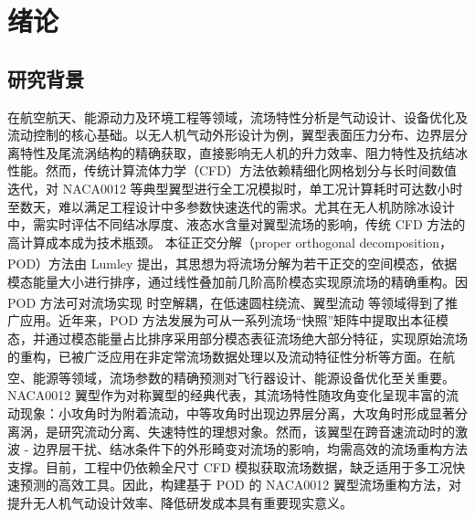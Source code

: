 \usetikzlibrary{shapes,arrows,positioning}

\chapter{绪论}
\label{cha:introduction}
\section{研究背景}
\label{sec:background}
在航空航天、能源动力及环境工程等领域，流场特性分析是气动设计、设备优化及流动控制的核心基础。以无人机气动外形设计为例，翼型表面压力分布、边界层分离特性及尾流涡结构的精确获取，直接影响无人机的升力效率、阻力特性及抗结冰性能。然而，传统计算流体力学（CFD）方法依赖精细化网格划分与长时间数值迭代，对 NACA0012 等典型翼型进行全工况模拟时，单工况计算耗时可达数小时至数天，难以满足工程设计中多参数快速迭代的需求。尤其在无人机防除冰设计中，需实时评估不同结冰厚度、液态水含量对翼型流场的影响，传统 CFD 方法的高计算成本成为技术瓶颈。
本征正交分解（proper orthogonal decomposition，POD）方法由 Lumley\textsuperscript{\cite{lumley1967structure}} 提出，其思想为将流场分解为若干正交的空间模态，依据模态能量大小进行排序，通过线性叠加前几阶高阶模态实现原流场的精确重构。因 POD 方法可对流场实现
时空解耦，在低速圆柱绕流\textsuperscript{\cite{wang2023}}、翼型流动\textsuperscript{\cite{sun2022analysis}} 等领域得到了推广应用。近年来，POD 方法发展为可从一系列流场“快照”矩阵中提取出本征模态，并通过模态能量占比排序采用部分模态表征流场绝大部分特征，实现原始流场的重构，已被广泛应用在非定常流场数据处理以及流动特征性分析等方面。在航空、能源等领域，流场参数的精确预测对飞行器设计、能源设备优化至关重要。\textsuperscript{\cite{HKDI202407028}}
NACA0012 翼型作为对称翼型的经典代表，其流场特性随攻角变化呈现丰富的流动现象：小攻角时为附着流动，中等攻角时出现边界层分离，大攻角时形成显著分离涡，是研究流动分离、失速特性的理想对象。然而，该翼型在跨音速流动时的激波 - 边界层干扰、结冰条件下的外形畸变对流场的影响，均需高效的流场重构方法支撑。目前，工程中仍依赖全尺寸 CFD 模拟获取流场数据，缺乏适用于多工况快速预测的高效工具。因此，构建基于 POD 的 NACA0012 翼型流场重构方法，对提升无人机气动设计效率、降低研发成本具有重要现实意义。



